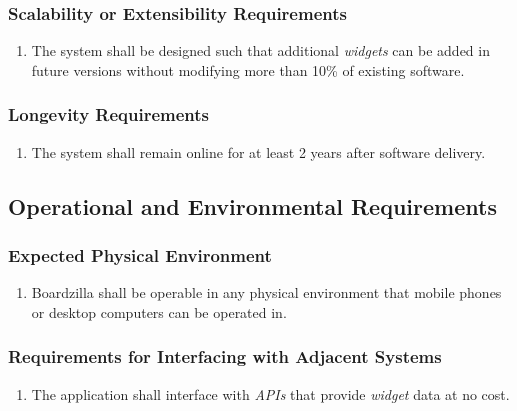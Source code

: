 \documentclass{article}
\begin{document}
	\subsubsection{Scalability or Extensibility Requirements}
	\label{ssub:scalability_or_extensibility_requirements}
	\begin{enumerate}[{PR}1. ]
		\item The system shall be designed such that additional \textit{widgets} can be added in future versions without modifying more than 10\% of existing software.
	\end{enumerate}
	
	\subsubsection{Longevity Requirements}
	\label{ssub:longevity_requirements}
	\begin{enumerate}[{PR}1. ]
		\item The system shall remain online for at least 2 years after software delivery. 
	\end{enumerate}
	
	
	\subsection{Operational and Environmental Requirements}
	\label{sub:operational_and_environmental_requirements}
	
	\subsubsection{Expected Physical Environment}
	\label{ssub:expected_physical_environment}
	\begin{enumerate}[{OE}1. ]
		\item Boardzilla shall be operable in any physical environment that mobile phones or desktop computers can be operated in.
	\end{enumerate}
	
	\subsubsection{Requirements for Interfacing with Adjacent Systems}
	\label{ssub:requirements_for_interfacing_with_adjacent_systems}
	\begin{enumerate}[{OE}1. ]
		\item The application shall interface with \textit{APIs} that provide \textit{widget} data at no cost.
	\end{enumerate}
	
\end{document}
